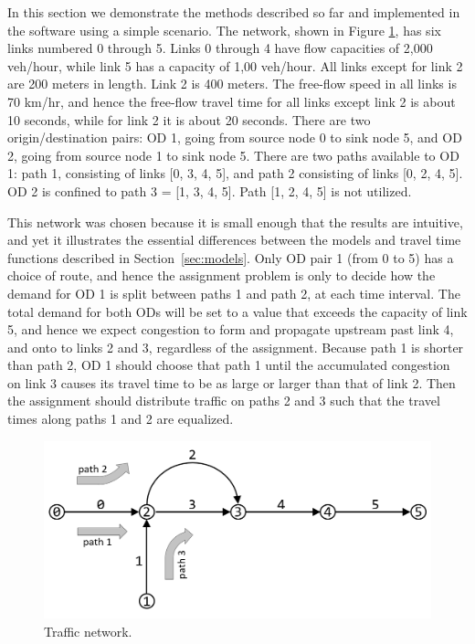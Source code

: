 In this section we demonstrate the methods described so far and implemented in the software using a simple scenario. The network, shown in Figure \ref{fig:config}, has six links numbered 0 through 5. Links 0 through 4 have flow capacities of 2,000 veh/hour, while link 5 has a capacity of 1,00 veh/hour. All links except for link 2 are 200 meters in length. Link 2 is 400 meters. The free-flow speed in all links is 70 km/hr, and hence the free-flow travel time for all links except link 2 is about 10 seconds, while for link 2 it is about 20 seconds. There are two origin/destination pairs: OD 1, going from source node 0 to sink node 5, and OD 2, going from source node 1 to sink node 5. There are two paths available to OD 1: path 1, consisting of links [0, 3, 4, 5], and path 2 consisting of links [0, 2, 4, 5]. OD 2 is confined to path 3 = [1, 3, 4, 5]. Path [1, 2, 4, 5] is not utilized.

This network was chosen because it is small enough that the results are intuitive, and yet it illustrates the essential differences between the models and travel time functions described in Section~\ref{sec:models}. Only OD pair 1 (from 0 to 5) has a choice of route, and hence the assignment problem is only to decide how the demand for OD 1 is split between paths 1 and path 2, at each time interval. The total demand for both ODs will be set to a value that exceeds the capacity of link 5, and hence we expect congestion to form and propagate upstream past link 4, and onto to links 2 and 3, regardless of the assignment. Because path 1 is shorter than path 2, OD 1 should choose that path 1 until the accumulated congestion on link 3 causes its travel time to be as large or larger than that of link 2. Then the assignment should distribute traffic on paths 2 and 3 such that the travel times along paths 1 and 2 are equalized. 

\begin{figure}[h]
    \centering
    \includegraphics[width=\linewidth]{figs/config.png}
    \caption{Traffic network.}
    \label{fig:config}
\end{figure}


